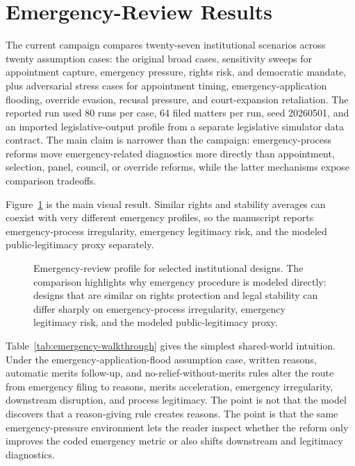 \documentclass[
    journal=jlc,
    manuscript=research-article,
    year=2026,
  ]{cup-journal}
\providecommand{\Description}[1]{}
\begin{document}
\section{Emergency-Review Results}

The current campaign compares twenty-seven institutional scenarios across twenty assumption cases: the original broad cases, sensitivity sweeps for appointment capture, emergency pressure, rights risk, and democratic mandate, plus adversarial stress cases for appointment timing, emergency-application flooding, override evasion, recusal pressure, and court-expansion retaliation. The reported run used 80 runs per case, 64 filed matters per run, seed 20260501, and an imported legislative-output profile from a separate legislative simulator data contract. The main claim is narrower than the campaign: emergency-process reforms move emergency-related diagnostics more directly than appointment, selection, panel, council, or override reforms, while the latter mechanisms expose comparison tradeoffs.

Figure~\ref{fig:emergency-profile} is the main visual result. Similar rights and stability averages can coexist with very different emergency profiles, so the manuscript reports emergency-process irregularity, emergency legitimacy risk, and the modeled public-legitimacy proxy separately.

\begin{figure}[hbt!]
\centering

\caption{Emergency-review profile for selected institutional designs. The comparison highlights why emergency procedure is modeled directly: designs that are similar on rights protection and legal stability can differ sharply on emergency-process irregularity, emergency legitimacy risk, and the modeled public-legitimacy proxy.}
\Description{Horizontal bar chart comparing emergency-process irregularity, emergency legitimacy risk, and modeled public-legitimacy proxy across selected court designs.}
\label{fig:emergency-profile}
\end{figure}



Table~\ref{tab:emergency-walkthrough} gives the simplest shared-world intuition. Under the emergency-application-flood assumption case, written reasons, automatic merits follow-up, and no-relief-without-merits rules alter the route from emergency filing to reasons, merits acceleration, emergency irregularity, downstream disruption, and process legitimacy. The point is not that the model discovers that a reason-giving rule creates reasons. The point is that the same emergency-pressure environment lets the reader inspect whether the reform only improves the coded emergency metric or also shifts downstream and legitimacy diagnostics.
\end{document}
